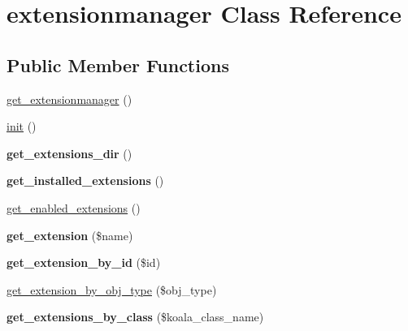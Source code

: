 \hypertarget{classextensionmanager}{
\section{extensionmanager Class Reference}
\label{classextensionmanager}
}
\subsection*{Public Member Functions}
\begin{DoxyCompactItemize}
\item 
\hyperlink{classextensionmanager_a1105f9109bc02c17f0ceaa90f0a409ea}{get\_\-extensionmanager} ()
\item 
\hyperlink{classextensionmanager_afbeafb7777293b21d34c695e13f5892b}{init} ()
\item 
\hypertarget{classextensionmanager_a67bc9492a51007c91bda10c8772c4f76}{
{\bfseries get\_\-extensions\_\-dir} ()}
\label{classextensionmanager_a67bc9492a51007c91bda10c8772c4f76}

\item 
\hypertarget{classextensionmanager_a327974c4a732113ac4c84e110973e6f2}{
{\bfseries get\_\-installed\_\-extensions} ()}
\label{classextensionmanager_a327974c4a732113ac4c84e110973e6f2}

\item 
\hyperlink{classextensionmanager_a8a86909f6565ce7aa83fdff8156a2428}{get\_\-enabled\_\-extensions} ()
\item 
\hypertarget{classextensionmanager_ac06017e8a437449228e463a3a1c0d87f}{
{\bfseries get\_\-extension} (\$name)}
\label{classextensionmanager_ac06017e8a437449228e463a3a1c0d87f}

\item 
\hypertarget{classextensionmanager_a8435c9859289fd64379dc51fe77cffab}{
{\bfseries get\_\-extension\_\-by\_\-id} (\$id)}
\label{classextensionmanager_a8435c9859289fd64379dc51fe77cffab}

\item 
\hyperlink{classextensionmanager_aa3da3f1631ff41aebe78ae8920e2d26a}{get\_\-extension\_\-by\_\-obj\_\-type} (\$obj\_\-type)
\item 
\hypertarget{classextensionmanager_ac50bf8cc9636ba95f00aa7640d621a50}{
{\bfseries get\_\-extensions\_\-by\_\-class} (\$koala\_\-class\_\-name)}
\label{classextensionmanager_ac50bf8cc9636ba95f00aa7640d621a50}


\end{DoxyCompactItemize}
